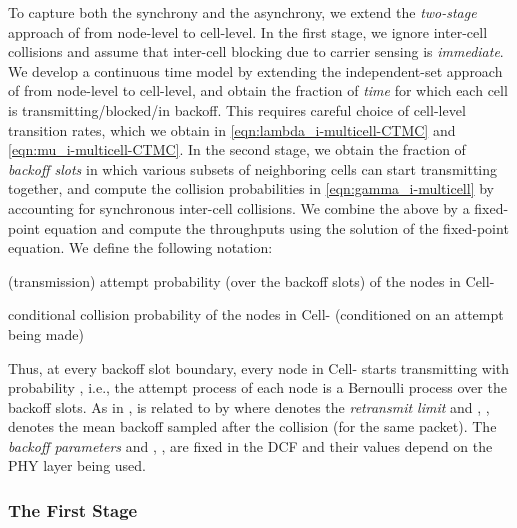 \documentclass[10pt,a4paper,journal]{IEEEtran}
\theoremstyle{definition}
\theoremstyle{remark}
\theoremstyle{plain}
\begin{document}
To capture both the synchrony and the asynchrony, we extend the \textit{two-stage} approach of \cite{wanet.garetto_etal08starvation} from node-level to cell-level. In the first stage, we ignore inter-cell collisions and assume that inter-cell blocking due to carrier sensing is \textit{immediate}. We develop a continuous time model by extending the independent-set approach of \cite{wanet.boorstyn87multihop} from node-level to cell-level, and obtain the fraction of \textit{time} for which each cell is transmitting/blocked/in backoff. This requires careful choice of cell-level transition rates, which we obtain in \eqref{eqn:lambda_i-multicell-CTMC} and \eqref{eqn:mu_i-multicell-CTMC}. In the second stage, we obtain the fraction of \textit{backoff slots} in which various subsets of neighboring cells can start transmitting together, and compute the collision probabilities in \eqref{eqn:gamma_i-multicell} by accounting for synchronous inter-cell collisions. We combine the above by a fixed-point equation and compute the throughputs using the solution of the fixed-point equation. We define the following notation: 



\vspace{1mm}

\noindent  \parbox[t] {7.5cm} {(transmission) attempt probability (over the backoff slots) of the nodes in Cell-}

\vspace{1mm}

\noindent  \parbox[t] {7.6cm} {conditional collision probability of the nodes in Cell- (conditioned on an attempt being made)}

\vspace{1mm}


Thus, at every backoff slot boundary, every node in Cell- starts transmitting with probability , i.e., the attempt process of each node is a Bernoulli process over the backoff slots. As in \cite{wanet.kumar_etal07new_insights},  is related to  by  
where  denotes the \textit{retransmit limit} and , , denotes the mean backoff sampled after the  collision (for the same packet). The \textit{backoff parameters}  and , , are fixed in the DCF and their values depend on the PHY layer being used. 







\subsubsection{The First Stage}
\label{subsubsec:first-stage}
\end{document}
